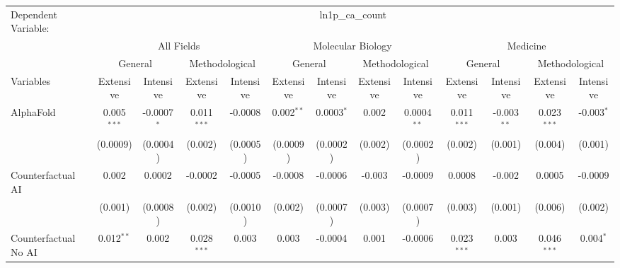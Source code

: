 \begingroup
\centering
\begin{tabular}{lcccccccccccc}
   \tabularnewline \midrule \midrule
   Dependent Variable: & \multicolumn{12}{c}{ln1p\_ca\_count}\\
 & \multicolumn{4}{c}{All Fields} & \multicolumn{4}{c}{Molecular Biology} & \multicolumn{4}{c}{Medicine} \\
\cmidrule(lr){2-5} \cmidrule(lr){6-9} \cmidrule(lr){10-13}
 & \multicolumn{2}{c}{General} & \multicolumn{2}{c}{Methodological} & \multicolumn{2}{c}{General} & \multicolumn{2}{c}{Methodological} & \multicolumn{2}{c}{General} & \multicolumn{2}{c}{Methodological} \\
\cmidrule(lr){2-3} \cmidrule(lr){4-5} \cmidrule(lr){6-7} \cmidrule(lr){8-9} \cmidrule(lr){10-11} \cmidrule(lr){12-13}
Variables & \multicolumn{1}{c}{Extensive} & \multicolumn{1}{c}{Intensive} & \multicolumn{1}{c}{Extensive} & \multicolumn{1}{c}{Intensive} & \multicolumn{1}{c}{Extensive} & \multicolumn{1}{c}{Intensive} & \multicolumn{1}{c}{Extensive} & \multicolumn{1}{c}{Intensive} & \multicolumn{1}{c}{Extensive} & \multicolumn{1}{c}{Intensive} & \multicolumn{1}{c}{Extensive} & \multicolumn{1}{c}{Intensive} \\
\cmidrule(lr){1-1}\cmidrule(lr){2-2} \cmidrule(lr){3-3} \cmidrule(lr){4-4} \cmidrule(lr){5-5} \cmidrule(lr){6-6} \cmidrule(lr){7-7} \cmidrule(lr){8-8} \cmidrule(lr){9-9} \cmidrule(lr){10-10} \cmidrule(lr){11-11} \cmidrule(lr){12-12} \cmidrule(lr){13-13}
   AlphaFold                                & 0.005$^{***}$ & -0.0007$^{*}$  & 0.011$^{***}$ & -0.0008        & 0.002$^{**}$  & 0.0003$^{*}$ & 0.002   & 0.0004$^{**}$ & 0.011$^{***}$ & -0.003$^{**}$  & 0.023$^{***}$ & -0.003$^{*}$\\   
                                            & (0.0009)      & (0.0004)       & (0.002)       & (0.0005)       & (0.0009)      & (0.0002)     & (0.002) & (0.0002)      & (0.002)       & (0.001)        & (0.004)       & (0.001)\\   
   Counterfactual AI                        & 0.002         & 0.0002         & -0.0002       & -0.0005        & -0.0008       & -0.0006      & -0.003  & -0.0009       & 0.0008        & -0.002         & 0.0005        & -0.0009\\   
                                            & (0.001)       & (0.0008)       & (0.002)       & (0.0010)       & (0.002)       & (0.0007)     & (0.003) & (0.0007)      & (0.003)       & (0.001)        & (0.006)       & (0.002)\\   
   Counterfactual No AI                     & 0.012$^{**}$  & 0.002          & 0.028$^{***}$ & 0.003          & 0.003         & -0.0004      & 0.001   & -0.0006       & 0.023$^{***}$ & 0.003          & 0.046$^{***}$ & 0.004$^{*}$\\   

\end{tabular}
